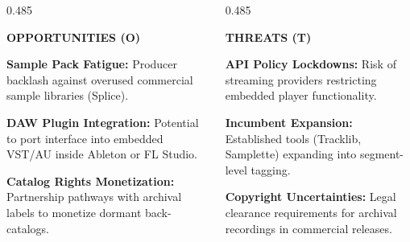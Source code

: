 \begin{frame}[t]
  \vspace{1.5mm}

  \begin{columns}[onlytextwidth, T]
    \begin{column}{0.485\textwidth}
      \begin{tcolorbox}[standardcard, top=3pt, bottom=3pt]
        {\scriptsize\bfseries\textcolor{accentemerald}{OPPORTUNITIES (O)}}\par\vspace{0.8mm}
        \begin{compactlist}
          \tiny
          \item \textbf{Sample Pack Fatigue:} Producer backlash against overused commercial sample libraries (Splice).
          \item \textbf{DAW Plugin Integration:} Potential to port interface into embedded VST/AU inside Ableton or FL Studio.
          \item \textbf{Catalog Rights Monetization:} Partnership pathways with archival labels to monetize dormant back-catalogs.
        \end{compactlist}
      \end{tcolorbox}
    \end{column}

    \begin{column}{0.485\textwidth}
      \begin{tcolorbox}[standardcard, top=3pt, bottom=3pt]
        {\scriptsize\bfseries\textcolor{textdim}{THREATS (T)}}\par\vspace{0.8mm}
        \begin{compactlist}
          \tiny
          \item \textbf{API Policy Lockdowns:} Risk of streaming providers restricting embedded player functionality.
          \item \textbf{Incumbent Expansion:} Established tools (Tracklib, Samplette) expanding into segment-level tagging.
          \item \textbf{Copyright Uncertainties:} Legal clearance requirements for archival recordings in commercial releases.
        \end{compactlist}
      \end{tcolorbox}
    \end{column}
  \end{columns}
\end{frame}
